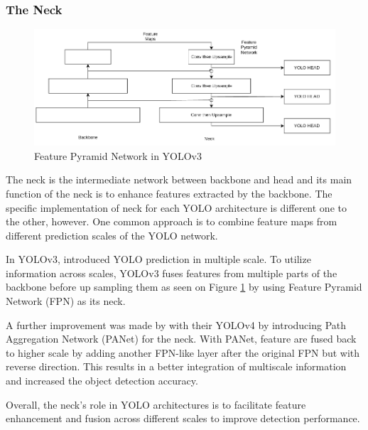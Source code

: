     \subsubsection{The Neck}
  
    \begin{figure}
        \centering
        \includegraphics[scale=0.55]{figures/yolo-architecture-rough.png}
        \caption{Feature Pyramid Network in YOLOv3}
        \label{fig:yolofpn}
    \end{figure}

    The neck is the intermediate network between backbone and head and its
    main function of the neck is to enhance features extracted by the backbone.
    The specific implementation of neck for each YOLO architecture is different one to the other, however.
    One common approach is to combine feature maps from different prediction scales of the YOLO network.

    In YOLOv3, \textcite{yolov3} introduced YOLO prediction in multiple scale.
    To utilize information across scales, YOLOv3 fuses features 
    from multiple parts of the backbone before up sampling them as seen on Figure \ref{fig:yolofpn} 
    by using Feature Pyramid Network (FPN) as its neck. 

    A further improvement was made by \textcite{yolov4} with their YOLOv4 by introducing Path 
    Aggregation Network (PANet) for the neck. 
    With PANet, feature are fused back to higher scale by adding another FPN-like layer after the original FPN
    but with reverse direction. This results in a better integration of multiscale information and increased the object detection accuracy.

    Overall, the neck's role in YOLO architectures is to facilitate feature enhancement and fusion across different scales to improve detection performance.
  
